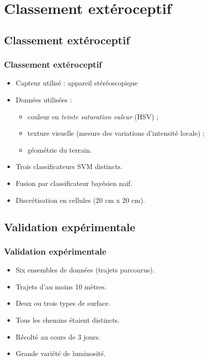 \section{Classement extéroceptif}
    
\subsection{Classement extéroceptif}
    \begin{frame}
        \frametitle{Classement extéroceptif}
        \begin{itemize}
        \item Capteur utilisé : appareil stéréoscopique
            \item Données utilisées :            
            \begin{itemize}
                \item couleur en \emph{teinte saturation valeur} (HSV) ;
                \item texture visuelle (mesure des variations d'intensité locale) ;
                \item géométrie du terrain.
            \end{itemize}
            \item Trois classificateurs SVM distincts.
            \item Fusion par classificateur bayésien naif.
            \item Discrétisation en cellules (20 cm x 20 cm).
        \end{itemize}
    \end{frame}
    
\subsection{Validation expérimentale}
    \begin{frame}
        \frametitle{Validation expérimentale}
        \begin{itemize}
            \item Six ensembles de données (trajets parcourus).                        
            \item Trajets d'au moins 10 mètres.
            \item Deux ou trois types de surface.
            \item Tous les chemins étaient distincts.
            \item Récolté au cours de 3 jours.
            \item Grande variété de luminosité.
        \end{itemize}
    \end{frame}
    

